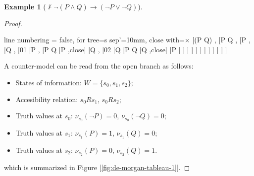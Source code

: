 \documentclass[12pt,a4paper]{article}
\theoremstyle{definition}
\newtheorem{example}{Example}[section]
\begin{document}
\begin{example}[$\not\vdash \neg(P \land Q) \to (\neg P \lor \neg Q)$]
    \hfill
    \begin{proof}
        \hfill
        \begin{center}
            \begin{tableau}
            {
                line numbering = false,
                for tree={s sep'=10mm},
                close with=$\times$ %
            }
            [\neg(P \land Q) ,
                [\neg P \lor \neg Q ,
                    [\neg P ,
                        [\neg Q ,
                            [01
                                [P ,
                                    [P \land Q 
                                        [P ,close]
                                        [Q ,
                                            [02
                                                [Q 
                                                    [P \land Q 
                                                        [Q ,close]
                                                        [P ]
                                                    ]
                                                ]
                                            ]
                                        ]
                                    ]
                                ]
                            ]
                        ]
                    ]
                ]
            ]
            \end{tableau}
        \end{center}

    A counter-model can be read from the open branch as follows:
    \begin{itemize}
        \item States of information: $W = \{s_0, s_1, s_2\}$;
        \item Accesibility relation: $s_0 R s_1$, $s_0 R s_2$;
        \item Truth values at $s_0$: $\nu_{s_0}(\neg P) = 0$, $\nu_{s_0}(\neg Q) = 0$;
        \item Truth values at $s_1$: $\nu_{s_1}(P) = 1$, $\nu_{s_1}(Q) = 0$;
        \item Truth values at $s_2$: $\nu_{s_2}(P) = 0$, $\nu_{s_2}(Q) = 1$.
    \end{itemize}
    which is summarized in Figure [\ref{fig:de-morgan-tableau-1}].
    

\end{proof}
\end{example}
\end{document}
